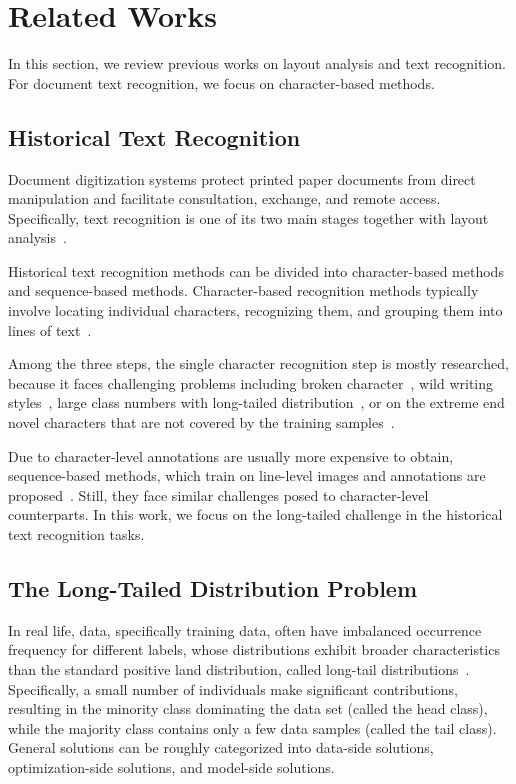 
\section{Related Works}
\label{sec:formatting}
In this section, we review previous works on layout analysis and text recognition. For document text recognition, we focus on character-based methods.


\subsection{Historical Text Recognition}
Document digitization systems protect printed paper documents from direct manipulation and facilitate consultation, exchange, and remote access. Specifically, text recognition is one of its two main stages together with layout analysis~\cite{jla}.

Historical text recognition methods can be divided into character-based methods and sequence-based methods. 
Character-based recognition methods typically involve locating individual characters, recognizing them, and grouping them into lines of text~\cite{papytwin}.

Among the three steps, the single character recognition step is mostly researched, because it faces challenging problems including broken character~\cite{broken}, wild writing styles~\cite{obc306}, large class numbers with long-tailed distribution~\cite{fewran}, or on the extreme end novel characters that are not covered by the training samples~\cite{hde,ligarature}.

Due to character-level annotations are usually more expensive to obtain,  sequence-based methods, which train on line-level images and annotations are proposed~\cite{eccvfork,jinic21}. Still, they face similar challenges posed to character-level counterparts. In this work, we focus on the long-tailed challenge in the historical text recognition tasks.

\subsection{The Long-Tailed Distribution Problem}


In real life, data, specifically training data, often have imbalanced occurrence frequency for different labels, whose distributions exhibit broader characteristics than the standard positive land distribution, called long-tail distributions~\cite{tailsurvey}. 
Specifically, a small number of individuals make significant contributions, resulting in the minority class dominating the data set (called the head class), while the majority class contains only a few data samples (called the tail class). 
General solutions can be roughly categorized into data-side solutions, optimization-side solutions, and model-side solutions.

